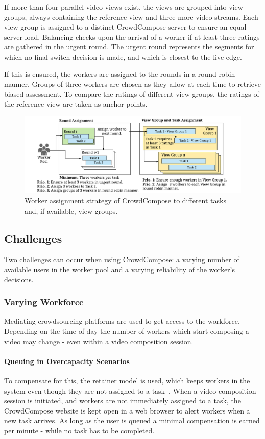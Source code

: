 If more than four parallel video views exist, the views are grouped into view groups, always containing the reference view and three more video streams. 
Each view group is assigned to a distinct CrowdCompose server to ensure an equal server load. 
Balancing checks upon the arrival of a worker if at least three ratings are gathered in the urgent round. 
The urgent round represents the segments for which no final switch decision is made, and which is closest to the live edge.

If this is ensured, the workers are assigned to the rounds in a round-robin manner. 
Groups of three workers are chosen as they allow at each time to retrieve biased assessment. 
To compare the ratings of different view groups, the ratings of the reference view are taken as anchor points. 
\begin{figure}[!htb]
\centering
\includegraphics[width=\textwidth]{./gfx/600_Composition/Balancer_simple}
\caption[Worker assignment strategy of CrowdCompose]{Worker assignment strategy of CrowdCompose to different tasks and, if available, view groups.}
\label{fig:620_user_assignment}
\end{figure}
\subsection{Challenges}
Two challenges can occur when using CrowdCompose: a varying number of available users in the worker pool and a varying reliability of the worker's decisions. 
\subsubsection{Varying Workforce}
Mediating crowdsourcing platforms are used to get access to the workforce.
Depending on the time of day the number of workers which start composing a video may change - even within a video composition session.

\paragraph{Queuing in Overcapacity Scenarios}
To compensate for this, the retainer model is used, which keeps workers in the system even though they are not assigned to a task~\cite{Bernstein2011}. 
When a video composition session is initiated, and workers are not immediately assigned to a task, the CrowdCompose website is kept open in a web browser to alert workers when a new task arrives.
As long as the user is queued a minimal compensation is earned per minute - while no task has to be completed.

